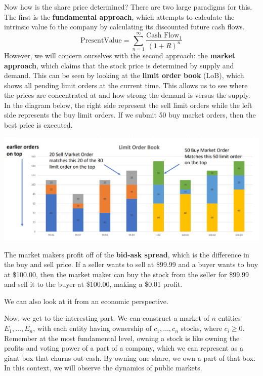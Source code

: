 \documentclass{article}
\begin{document}
    Now how is the share price determined? There are two large paradigms for this. The first is the \textbf{fundamental approach}, which attempts to calculate the intrinsic value fo the company by calculating its discounted future cash flows. 
    \[\mathrm{Present Value} = \sum_{n=1}^\infty \frac{\text{Cash Flow}_1}{(1 + R)^n}\]
    However, we will concern ourselves with the second approach: the \textbf{market approach}, which claims that the stock price is determined by supply and demand. This can be seen by looking at the \textbf{limit order book} (LoB), which shows all pending limit orders at the current time. This allows us to see where the prices are concentrated at and how strong the demand is versus the supply. In the diagram below, the right side represent the sell limit orders while the left side represents the buy limit orders. If we submit 50 buy market orders, then the best price is executed. 
    \begin{center}
        \includegraphics[scale=0.3]{img/limit_order_book.png}
    \end{center}
    The market makers profit off of the \textbf{bid-ask spread}, which is the difference in the buy and sell price. If a seller wants to sell at \$99.99 and a buyer wants to buy at \$100.00, then the market maker can buy the stock from the seller for \$99.99 and sell it to the buyer at \$100.00, making a \$0.01 profit. 

    We can also look at it from an economic perspective. 

    Now, we get to the interesting part. We can construct a market of $n$ entities $E_1, \ldots, E_n$, with each entity having ownership of $c_1, \ldots, c_n$ stocks, where $c_i \geq 0$. Remember at the most fundamental level, owning a stock is like owning the profits and voting power of a part of a company, which we can represent as a giant box that churns out cash. By owning one share, we own a part of that box. In this context, we will observe the dynamics of public markets. 
\end{document}
